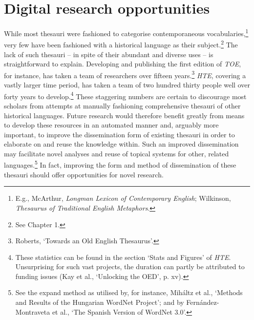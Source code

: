 \section{Digital research opportunities}
\label{sect:Introduction:Impediments}

While most thesauri were fashioned to categorise contemporaneous vocabularies,\footnote{E.g., McArthur, \textit{Longman Lexicon of Contemporary English}; Wilkinson, \textit{Thesaurus of Traditional English Metaphors}.} very few have been fashioned with a historical language as their subject.\footnote{See Chapter 1.} %
The lack of such thesauri -- in spite of their abundant and diverse uses -- is straightforward to explain. Developing and publishing the first edition of \textit{TOE}, for instance, has taken a team of researchers over fifteen years.\footnote{Roberts, `Towards an Old English Thesaurus'.} \textit{HTE}, covering a vastly larger time period, has taken a team of two hundred thirty people well over forty years to develop.\footnote{These statistics can be found in the section `Stats and Figures' of \textit{HTE}. Unsurprising for such vast projects, the duration can partly be attributed to funding issues (Kay et al., `Unlocking the OED', p. xv).} These staggering numbers are certain to discourage most scholars from attempts at manually fashioning comprehensive thesauri of other historical languages. Future research would therefore benefit greatly from means to develop these resources in an automated manner and, arguably more important, to improve the dissemination form of existing thesauri in order to elaborate on and reuse the knowledge within. Such an improved dissemination may facilitate novel analyses and reuse of topical systems for other, related languages.\footnote{See the expand method as utilised by, for instance, Miháltz et al., `Methods and Results of the Hungarian WordNet Project'; and by Fernández-Montraveta et al., `The Spanish Version of WordNet 3.0'.} In fact, improving the form and method of dissemination of these thesauri should offer opportunities for novel research.

